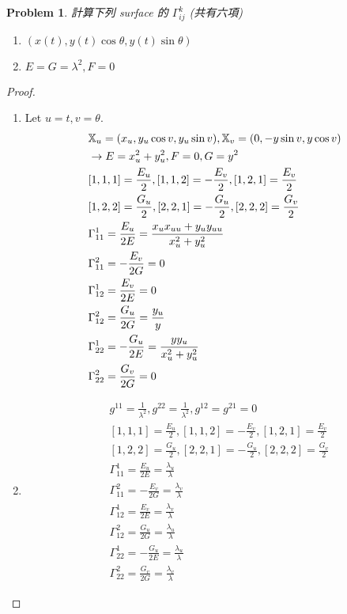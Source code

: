 \documentclass[10pt,a4paper]{article}
\newcounter{theProblemCounter}
\newtheorem{problem}[theProblemCounter]{Problem}
\begin{document}
\setcounter{theProblemCounter}{6}
\begin{problem}
計算下列 surface 的 $\Gamma_{ij}^k$ (共有六項)
\begin{enumerate}
\item[(b)]
$(x(t),y(t)\cos\theta,y(t)\sin\theta)$
\item[(c)]
$E=G=\lambda^2, F=0$
\end{enumerate}
\end{problem}
\begin{proof}
\begin{enumerate}
\item[(b)]
Let $u=t, v=\theta$.
\begin{align*}
&\mathbb{X}_u=(x_u,y_u\cos v,y_u\sin v), \mathbb{X}_v=(0,-y\sin v,y\cos v)\\
&\rightarrow E=x_u^2+y_u^2, F=0, G=y^2\\
&{[}1,1,1]=\frac{E_u}{2}, {[}1,1,2]=-\frac{E_v}{2}, {[}1,2,1]=\frac{E_v}{2}\\
&{[}1,2,2]=\frac{G_u}{2}, {[}2,2,1]=-\frac{G_u}{2}, {[}2,2,2]=\frac{G_v}{2}\\
&\Gamma_{11}^1=\frac{E_u}{2E}=\frac{x_ux_{uu}+y_uy_{uu}}{x_u^2+y_u^2}\\
&\Gamma_{11}^2=-\frac{E_v}{2G}=0\\
&\Gamma_{12}^1=\frac{E_v}{2E}=0\\
&\Gamma_{12}^2=\frac{G_u}{2G}=\frac{y_u}{y}\\
&\Gamma_{22}^1=-\frac{G_u}{2E}=\frac{yy_u}{x_u^2+y_u^2}\\
&\Gamma_{22}^2=\frac{G_v}{2G}=0
\end{align*}
\item[(c)]
\begin{align*}
&g^{11}=\frac{1}{\lambda^2}, g^{22}=\frac{1}{\lambda^2}, g^{12}=g^{21}=0\\
&[1,1,1]=\frac{E_u}{2}, [1,1,2]=-\frac{E_v}{2}, [1,2,1]=\frac{E_v}{2}\\
&[1,2,2]=\frac{G_u}{2}, [2,2,1]=-\frac{G_u}{2}, [2,2,2]=\frac{G_v}{2}\\
&\Gamma_{11}^1=\frac{E_u}{2E}=\frac{\lambda_u}{\lambda}\\
&\Gamma_{11}^2=-\frac{E_v}{2G}=\frac{\lambda_v}{\lambda}\\
&\Gamma_{12}^1=\frac{E_v}{2E}=\frac{\lambda_v}{\lambda}\\
&\Gamma_{12}^2=\frac{G_u}{2G}=\frac{\lambda_u}{\lambda}\\
&\Gamma_{22}^1=-\frac{G_u}{2E}=\frac{\lambda_u}{\lambda}\\
&\Gamma_{22}^2=\frac{G_v}{2G}=\frac{\lambda_v}{\lambda}
\end{align*}
\end{enumerate}
\end{proof}
\end{document}
